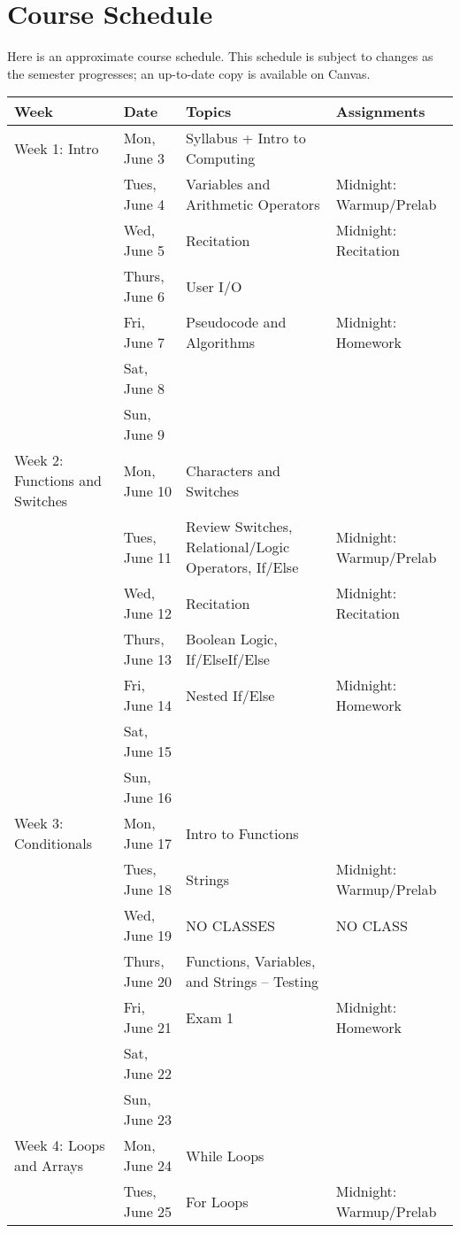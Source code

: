 \section{Course Schedule}
Here is an approximate course schedule. This schedule is subject to changes as the semester progresses; an up-to-date copy is available on Canvas.

\begin{longtable}[H]{|p{1.5in}|p{1in}|p{2in}|p{1.5in}|} \hline
        Week & Date & Topics & Assignments \\ \hline
Week 1: Intro & Mon, June 3 & Syllabus + Intro to Computing &  \\
& Tues, June 4 & Variables and Arithmetic Operators & Midnight: Warmup/Prelab \\
& Wed, June 5 & Recitation & Midnight: Recitation \\
& Thurs, June 6 & User I/O & \\
& Fri, June 7 & Pseudocode and Algorithms & Midnight: Homework \\
& Sat, June 8 & & \\
& Sun, June 9 & & \\ \hline
Week 2: Functions and Switches & Mon, June 10 & Characters and Switches & \\
 & Tues, June 11 & Review Switches, Relational/Logic Operators, If/Else & Midnight: Warmup/Prelab \\
 & Wed, June 12 & Recitation & Midnight: Recitation  \\
 & Thurs, June 13 & Boolean Logic, If/ElseIf/Else  & \\
 & Fri, June 14 & Nested If/Else & Midnight: Homework \\
 & Sat, June 15 & & \\
 & Sun, June 16 & & \\ \hline
Week 3: Conditionals & Mon, June 17 & Intro to Functions & \\
 & Tues, June 18 & Strings & Midnight: Warmup/Prelab \\
 & Wed, June 19 & NO CLASSES & NO CLASS \\
 & Thurs, June 20 & Functions, Variables, and Strings – Testing  &  \\
 & Fri, June 21 & Exam 1 & Midnight: Homework \\
 & Sat, June 22 & & \\
 & Sun, June 23 & & \\ \hline
Week 4: Loops and Arrays & Mon, June 24 & While Loops & \\
 & Tues, June 25 & For Loops & Midnight: Warmup/Prelab \\

\end{longtable}
